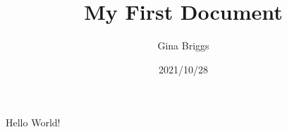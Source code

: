\documentclass{article}
\title{My First Document}
\date{2021/10/28}
\author{Gina Briggs}
\begin{document}
	\maketitle
	\newpage
	Hello World!
\end{document}
